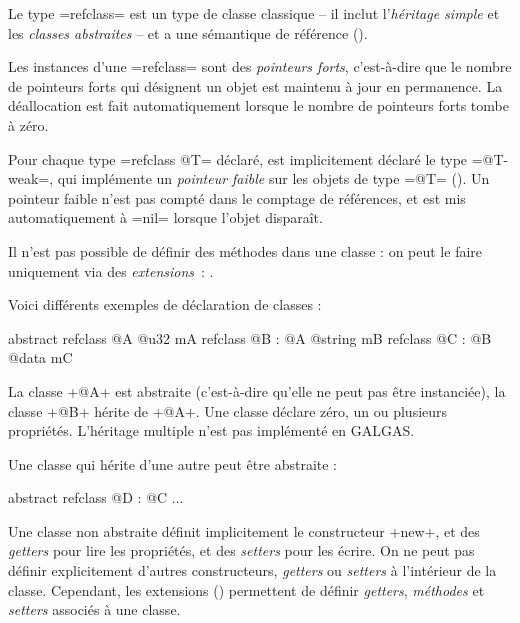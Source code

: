 



Le type \ggsq=refclass= est un type de classe classique -- il inclut l'\emph{héritage simple} et les \emph{classes abstraites} -- et a une sémantique de référence ().

Les instances d'une \ggsq=refclass= sont des \emph{pointeurs forts}, c'est-à-dire que le nombre de pointeurs forts qui désignent un objet est maintenu à jour en permanence. La déallocation est fait automatiquement lorsque le nombre de pointeurs forts tombe à zéro.

Pour chaque type \ggsq=refclass @T= déclaré, est implicitement déclaré le type \ggsq=@T-weak=, qui implémente un \emph{pointeur faible} sur les objets de type \ggsq=@T= (). Un pointeur faible n'est pas compté dans le comptage de références, et est mis automatiquement à \ggsq=nil= lorsque l'objet disparaît.

Il n'est pas possible de définir des méthodes dans une classe : on peut le faire uniquement via des \emph{extensions}~: .







Voici différents exemples de déclaration de classes :

\begin{galgas4}
abstract refclass @A {
  @u32 mA
}
refclass @B : @A {
  @string mB
}
refclass @C : @B {
  @data mC
}
\end{galgas4}

La classe \ggsq+@A+ est abstraite (c'est-à-dire qu'elle ne peut pas être instanciée), la classe \ggsq+@B+ hérite de \ggsq+@A+. Une classe déclare zéro, un ou plusieurs propriétés. L'héritage multiple n'est pas implémenté en GALGAS.

Une classe qui hérite d'une autre peut être abstraite :
\begin{galgas4}
abstract refclass @D : @C {
  ...
 }
\end{galgas4}

Une classe non abstraite définit implicitement le constructeur \ggsq+new+, et des \emph{getters} pour lire les propriétés, et des \emph{setters} pour les écrire. On ne peut pas définir explicitement d'autres constructeurs, \emph{getters} ou \emph{setters} à l'intérieur de la classe. Cependant,  les extensions () permettent de définir \emph{getters}, \emph{méthodes} et \emph{setters} associés à une classe.











